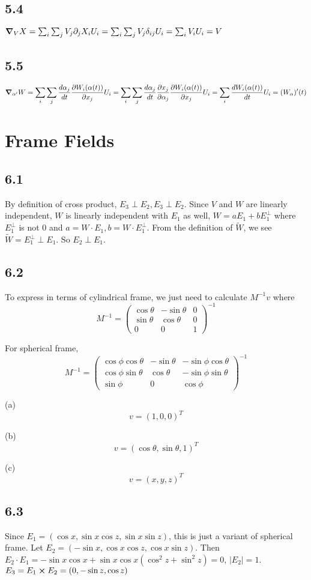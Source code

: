 \documentclass[12pt]{article}
\begin{document}
\subsection*{5.4}
$\grad_V X = \sum_i \sum_j V_j \partial_j X_i U_i  = \sum_i \sum_j V_j \delta_{ij} U_i = \sum_i V_i U_i = V$

\subsection*{5.5}
$$\grad_{\alpha'}W = \sum_i \sum_j \frac{d \alpha_j}{dt} \frac{\partial W_i(\alpha(t))}{\partial x_j} U_i = \sum_i \sum_j \frac{d \alpha_j}{dt} \frac{\partial x_j}{\partial \alpha_j } \frac{\partial W_i(\alpha(t))}{\partial x_j} U_i = \sum_i \frac{dW_i(\alpha(t))}{dt}U_i  = (W_\alpha)'(t)$$

\section{Frame Fields}

\subsection*{6.1}
By definition of cross product, $E_3 \perp E_2, E_3 \perp E_2$. Since $V$ and $W$ are linearly independent, $W$ is linearly independent with $E_1$ as well, $W = aE_1 + bE_1^{\perp}$ where $E_1^{\perp}$ is not 0 and $a = W\cdot E_1, b= W \cdot E_1^{\perp}$. From the definition of $\tilde{W}$, we see $\tilde{W} = E_1^{\perp} \perp E_1$. So $E_2 \perp E_1$.

\subsection*{6.2}
To express in terms of cylindrical frame, we just need to calculate $M^{-1}v$
where 
$$ M^{-1} =  \begin{pmatrix}
	\cos\theta &  -\sin \theta & 0\\
	\sin \theta & \cos \theta & 0\\ 
	0 & 0 & 1
\end{pmatrix}^{-1}$$

For spherical frame, 
$$
 M^{-1} = \begin{pmatrix}
 	\cos \phi \cos \theta &  -\sin \theta & -\sin\phi \cos \theta \\
 	\cos \phi \sin \theta & \cos \theta & -\sin\phi \sin \theta \\
 	\sin \phi & 0 & \cos \phi
 \end{pmatrix}^{-1}
$$


(a) $$ v = (1, 0, 0)^T$$

(b) $$ v = (\cos \theta, \sin \theta, 1)^T $$

(c) $$ v = (x, y, z)^T$$

\subsection*{6.3}
Since $ E_1 = (\cos x, \sin x \cos z, \sin x \sin z)$, this is just a variant of spherical frame. Let $E_2 = (-\sin x, \cos x \cos z, \cos x \sin z)$. Then $E_2 \cdot E_1 = -\sin x \cos x + \sin x \cos x(\cos^2 z + \sin^2 z) = 0$, $|E_2| = 1$. $E_3 = E_1 \cross E_2 = (0, -\sin z, \cos z)$ \QED
\end{document}
